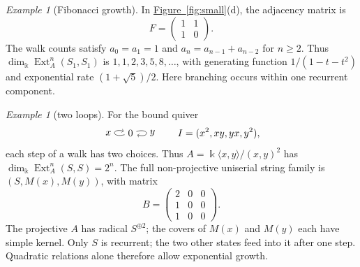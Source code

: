 \documentclass[reqno]{amsart}
\numberwithin{equation}{section}
\newtheorem{lemma}[theorem]{Lemma}
\theoremstyle{definition}
\theoremstyle{remark}
\newtheorem{example}[theorem]{Example}
\DeclareMathOperator{\Ext}{Ext}
\newcommand{\kk}{\Bbbk}
\newcommand{\kdim}{\dim_{\kk}}
\newcommand{\figref}[1]{\hyperref[#1]{Figure~\ref*{#1}}}
\begin{document}
\begin{example}[Fibonacci growth]\label{ex:fibonacci}
In \figref{fig:small}(d), the adjacency matrix is
\[
 F=\begin{pmatrix}1&1\\1&0\end{pmatrix}.
\]
The walk counts satisfy \(a_0=a_1=1\) and \(a_n=a_{n-1}+a_{n-2}\) for \(n\ge2\). Thus \(\kdim\Ext_A^n(S_1,S_1)\) is \(1,1,2,3,5,8,\ldots\), with generating function \(1/(1-t-t^2)\) and exponential rate \((1+\sqrt5)/2\). Here branching occurs within one recurrent component.
\end{example}

\begin{example}[two loops]\label{ex:two-loops}
For the bound quiver
\[
\begin{tikzpicture}[baseline=(v.base)]
\node (v) at (0,0) {\(0\)};
\draw[->] (v) edge[loop left] node[left] {\(x\)} (v);
\draw[->] (v) edge[loop right] node[right] {\(y\)} (v);
\end{tikzpicture}
\qquad I=(x^2,xy,yx,y^2),
\]
each step of a walk has two choices. Thus \(A=\kk\langle x,y\rangle/(x,y)^2\) has \(\kdim\Ext_A^n(S,S)=2^n\). The full non-projective uniserial string family is \((S,M(x),M(y))\), with matrix
\[
 B=\begin{pmatrix}2&0&0\\1&0&0\\1&0&0\end{pmatrix}.
\]
The projective \(A\) has radical \(S^{\oplus2}\); the covers of \(M(x)\) and \(M(y)\) each have simple kernel. Only \(S\) is recurrent; the two other states feed into it after one step. Quadratic relations alone therefore allow exponential growth.
\end{example}

\end{document}
